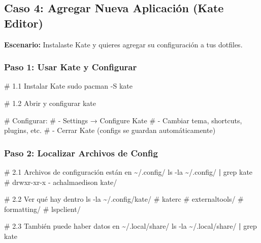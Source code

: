 \documentclass[
  doc,
  floatsintext,
  longtable,
  a4paper,
  nolmodern,
  notxfonts,
  notimes,
  12pt,
  colorlinks=true,linkcolor=blue,citecolor=blue,urlcolor=blue]{apa7}
\newenvironment{Shaded}{\begin{snugshade}}{\end{snugshade}}
\newcommand{\AttributeTok}[1]{\textcolor[rgb]{0.40,0.45,0.13}{#1}}
\newcommand{\CommentTok}[1]{\textcolor[rgb]{0.37,0.37,0.37}{#1}}
\newcommand{\ExtensionTok}[1]{\textcolor[rgb]{0.00,0.23,0.31}{#1}}
\newcommand{\FunctionTok}[1]{\textcolor[rgb]{0.28,0.35,0.67}{#1}}
\newcommand{\KeywordTok}[1]{\textcolor[rgb]{0.00,0.23,0.31}{\textbf{#1}}}
\newcommand{\NormalTok}[1]{\textcolor[rgb]{0.00,0.23,0.31}{#1}}
\begin{document}
\subsection{Caso 4: Agregar Nueva Aplicación (Kate
Editor)}\label{caso-4-agregar-nueva-aplicaciuxf3n-kate-editor}

\textbf{Escenario:} Instalaste Kate y quieres agregar su configuración a
tus dotfiles.

\subsubsection{Paso 1: Usar Kate y
Configurar}\label{paso-1-usar-kate-y-configurar}

\begin{Shaded}
\begin{Highlighting}[]
\CommentTok{\# 1.1 Instalar Kate}
\FunctionTok{sudo}\NormalTok{ pacman }\AttributeTok{{-}S}\NormalTok{ kate}

\CommentTok{\# 1.2 Abrir y configurar}
\ExtensionTok{kate}

\CommentTok{\# Configurar:}
\CommentTok{\# {-} Settings → Configure Kate}
\CommentTok{\# {-} Cambiar tema, shortcuts, plugins, etc.}
\CommentTok{\# {-} Cerrar Kate (configs se guardan automáticamente)}
\end{Highlighting}
\end{Shaded}

\subsubsection{Paso 2: Localizar Archivos de
Config}\label{paso-2-localizar-archivos-de-config}

\begin{Shaded}
\begin{Highlighting}[]
\CommentTok{\# 2.1 Archivos de configuración están en \textasciitilde{}/.config/}
\FunctionTok{ls} \AttributeTok{{-}la}\NormalTok{ \textasciitilde{}/.config/ }\KeywordTok{|} \FunctionTok{grep}\NormalTok{ kate}
\CommentTok{\# drwxr{-}xr{-}x  {-} achalmaedison kate/}

\CommentTok{\# 2.2 Ver qué hay dentro}
\FunctionTok{ls} \AttributeTok{{-}la}\NormalTok{ \textasciitilde{}/.config/kate/}
\CommentTok{\# katerc}
\CommentTok{\# externaltools/}
\CommentTok{\# formatting/}
\CommentTok{\# lspclient/}

\CommentTok{\# 2.3 También puede haber datos en \textasciitilde{}/.local/share/}
\FunctionTok{ls} \AttributeTok{{-}la}\NormalTok{ \textasciitilde{}/.local/share/ }\KeywordTok{|} \FunctionTok{grep}\NormalTok{ kate}
\end{Highlighting}
\end{Shaded}
\end{document}
